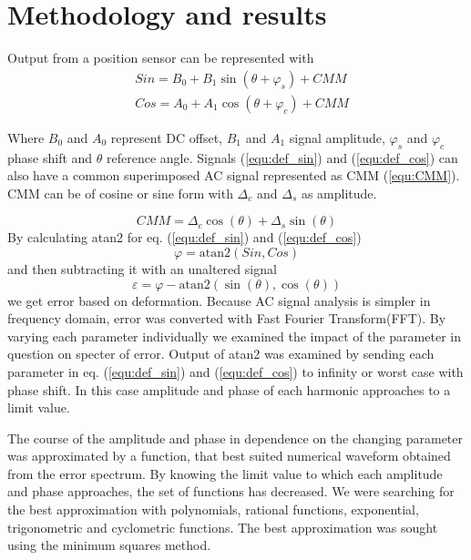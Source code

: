 \documentclass[a4paper]{article}
\begin{document}
\section{Methodology and results}
Output from a position sensor can be represented with
\begin{eqnarray}
\label{equ:def_sin}
&Sin = B_{0} + B_1 \sin(\theta + \varphi_{s}) + CMM\\
\label{equ:def_cos}
&Cos = A_{0} + A_1 \cos(\theta + \varphi_{c}) + CMM
\end{eqnarray}

Where $B_0$ and $A_0$ represent DC offset, $B_1$ and $A_1$ signal amplitude, $\varphi_s$ and $\varphi_c$  phase shift and $\theta$ reference angle. Signals (\ref{equ:def_sin}) and (\ref{equ:def_cos}) can also have a common superimposed AC signal  represented as CMM (\ref{equ:CMM}). CMM can be of cosine or sine form with $\Delta_c$ and $\Delta_s$ as amplitude.

\begin{equation}
\label{equ:CMM}
CMM = \Delta_c \cos(\theta)+\Delta_s \sin(\theta)
\end{equation}
By calculating atan2 for eq. (\ref{equ:def_sin}) and (\ref{equ:def_cos})
\begin{equation}
\label{equ:def_kot}
\varphi = \mathrm{atan2}(Sin,Cos)
\end{equation}
and then subtracting it with an unaltered signal
\begin{equation}
\label{equ:def_err}
\varepsilon =\varphi - \mathrm{atan2}(\sin(\theta),\cos(\theta))
\end{equation}
we get error based on deformation. Because  AC signal analysis is simpler in frequency domain, error was converted with Fast Fourier Transform(FFT). By varying each parameter individually we examined the impact of the parameter in question on specter of error. Output of atan2 was examined by sending each parameter in eq. (\ref{equ:def_sin}) and (\ref{equ:def_cos}) to infinity or worst case with phase shift.
In this case amplitude and phase of each harmonic approaches to a limit value.

The course of the amplitude and phase in dependence on the changing parameter was approximated by a function, that best suited numerical waveform obtained from the error spectrum. By knowing the limit value to which each amplitude and phase approaches, the set of functions has decreased. We were searching for the best approximation with polynomials, rational functions, exponential, trigonometric and cyclometric functions. The best approximation was sought using the minimum squares method.
\end{document}
